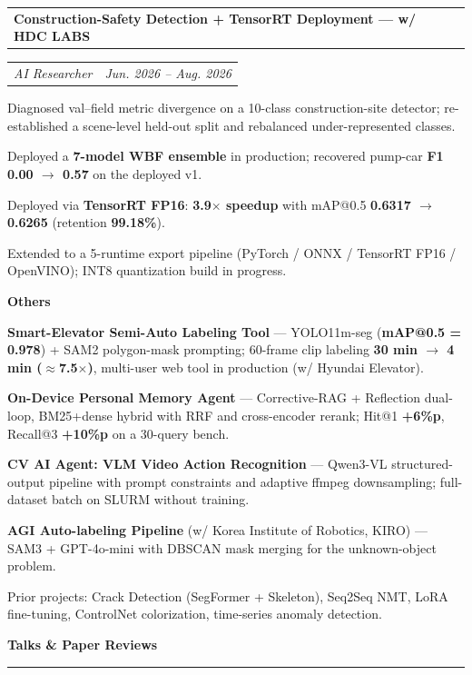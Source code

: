 \documentclass[10pt,a4paper]{article}
\makeatletter
\renewcommand{\section}[1]{%
  \par\vspace{10pt}%
  {\color{accent}\Large\bfseries #1}%
  \par\vspace{-6pt}%
  {\color{accent}\rule{\textwidth}{0.8pt}}%
  \par\vspace{4pt}%
  \@afterheading}
\newcommand{\cvEntry}[4]{%
  \par\vspace{3pt}%
  \noindent\begin{tabularx}{\textwidth}{@{}X r@{}}
    \textbf{#1} & {\color{accent}#2} \\
  \end{tabularx}\par\vspace{-4pt}%
  \noindent\begin{tabularx}{\textwidth}{@{}X r@{}}
    \textit{#3} & {\color{accent}\textit{#4}} \\
  \end{tabularx}\par}
\newenvironment{cvitems}{%
  \vspace{-2pt}%
  \begin{list}{\textbullet}{%
    \setlength{\leftmargin}{1.4em}%
    \setlength{\rightmargin}{0em}%
    \setlength{\topsep}{1pt}%
    \setlength{\itemsep}{2pt}%
    \setlength{\parsep}{0pt}%
    \setlength{\labelsep}{0.6em}}%
}{\end{list}\vspace{2pt}}
\makeatother
\begin{document}
\cvEntry{Construction-Safety Detection + TensorRT Deployment --- w/ HDC LABS}{}{AI Researcher}{Jun. 2026 -- Aug. 2026}
\begin{cvitems}
  \item Diagnosed val--field metric divergence on a 10-class construction-site detector; re-established a scene-level held-out split and rebalanced under-represented classes.
  \item Deployed a \textbf{7-model WBF ensemble} in production; recovered pump-car \textbf{F1 0.00 $\to$ 0.57} on the deployed v1.
  \item Deployed via \textbf{TensorRT FP16}: \textbf{3.9$\times$ speedup} with mAP@0.5 \textbf{0.6317 $\to$ 0.6265} (retention \textbf{99.18\%}).
  \item Extended to a 5-runtime export pipeline (PyTorch / ONNX / TensorRT FP16 / OpenVINO); INT8 quantization build in progress.
\end{cvitems}

\vspace{2pt}
\textbf{Others}
\begin{cvitems}
  \item \textbf{Smart-Elevator Semi-Auto Labeling Tool} --- YOLO11m-seg (\textbf{mAP@0.5 = 0.978}) + SAM2 polygon-mask prompting; 60-frame clip labeling \textbf{30 min $\to$ 4 min ($\approx$7.5$\times$)}, multi-user web tool in production (w/ Hyundai Elevator).
  \item \textbf{On-Device Personal Memory Agent} --- Corrective-RAG + Reflection dual-loop, BM25+dense hybrid with RRF and cross-encoder rerank; Hit@1 \textbf{+6\%p}, Recall@3 \textbf{+10\%p} on a 30-query bench.
  \item \textbf{CV AI Agent: VLM Video Action Recognition} --- Qwen3-VL structured-output pipeline with prompt constraints and adaptive ffmpeg downsampling; full-dataset batch on SLURM without training.
  \item \textbf{AGI Auto-labeling Pipeline} (w/ Korea Institute of Robotics, KIRO) --- SAM3 + GPT-4o-mini with DBSCAN mask merging for the unknown-object problem.
  \item Prior projects: Crack Detection (SegFormer + Skeleton), Seq2Seq NMT, LoRA fine-tuning, ControlNet colorization, time-series anomaly detection.
\end{cvitems}

\section{Talks \& Paper Reviews}
\end{document}
